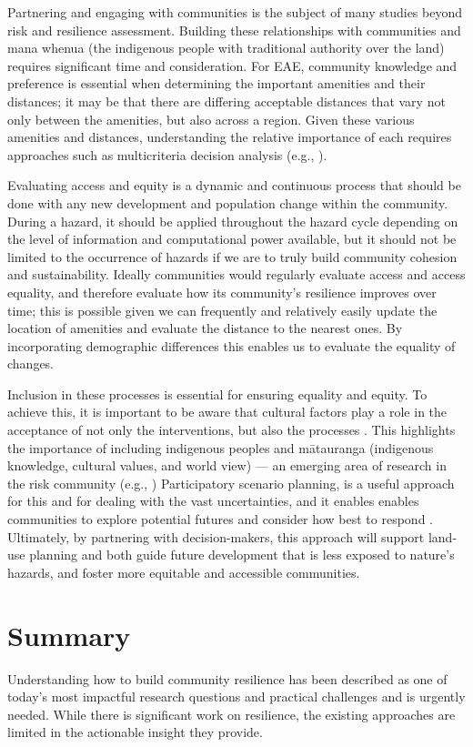 \documentclass[onecolumn,doublespacing]{risa}
\let \citeA \textcite
\let \cite \parencite
\begin{document}
Partnering and engaging with communities is the subject of many studies beyond risk and resilience assessment.
Building these relationships with communities and mana whenua (the indigenous people with traditional authority over the land) requires significant time and consideration.
For EAE, community knowledge and preference is essential when determining the important amenities and their distances; it may be that there are differing acceptable distances that vary not only between the amenities, but also across a region.
Given these various amenities and distances, understanding the relative importance of each requires approaches such as multicriteria decision analysis (e.g., \citeA{Guikema1999-aj}).

Evaluating access and equity is a dynamic and continuous process that should be done with any new development and population change within the community. 
During a hazard, it should be applied throughout the hazard cycle depending on the level of information and computational power available, but it should not be limited to the occurrence of hazards if we are to truly build community cohesion and sustainability.
Ideally communities would regularly evaluate access and access equality, and therefore evaluate how its community's resilience improves over time; this is possible given we can frequently and relatively easily update the location of amenities and evaluate the distance to the nearest ones. 
By incorporating demographic differences this enables us to evaluate the equality of changes.

Inclusion in these processes is essential for ensuring equality and equity.
To achieve this, it is important to be aware that cultural factors play a role in the acceptance of not only the interventions, but also the processes \cite{Flynn2018-mj}.
This highlights the importance of including indigenous peoples and m\=atauranga (indigenous knowledge, cultural values, and world view) --- an emerging area of research in the risk community (e.g., \citeA{Hikuroa2017-zf,Genuis2015-bq,King2007-zf})
Participatory scenario planning, is a useful approach for this and for dealing with the vast uncertainties, and it enables enables communities to explore potential futures and consider how best to respond \cite{Flynn2018-mj,Goodspeed2020-gm}.
Ultimately, by partnering with decision-makers, this approach will support land-use planning and both guide future development that is less exposed to nature's hazards, and foster more equitable and accessible communities. 


\section{Summary}
\label{sec:disc}
Understanding how to build community resilience has been described as one of today's most impactful research questions and practical challenges \cite{Caldarice2019-tv} and is urgently needed.
While there is significant work on resilience, the existing approaches are limited in the actionable insight they provide.
\end{document}
